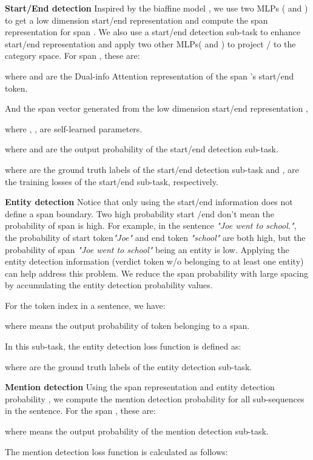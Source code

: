 \documentclass[11pt,a4paper]{article}
\begin{document}
\textbf{Start/End detection}
Inspired by the biaffine model \cite{dozat2016biaffine}, we use two MLPs ( and ) to get a low dimension start/end representation  and compute the span representation  for span .
We also use a start/end detection sub-task to enhance start/end representation  and apply two other MLPs( and ) to project / to the category space.
For span , these are:

where  and  are the Dual-info Attention representation of the span 's start/end token.

And the span vector  generated from the low dimension start/end representation ,

where ,
,
 are self-learned parameters.


where  and  are the output probability of the start/end detection sub-task.


where  are the ground truth labels of the start/end detection sub-task and ,  are the training losses of the start/end sub-task, respectively.



\textbf{Entity detection}
Notice that only using the start/end information does not define a span boundary. Two high probability start /end  don't mean the probability of span  is high.
For example, in the sentence \textit{"Joe went to school."}, the probability of start token\textit{"Joe"} and end token \textit{"school"} are both high, but the probability of span \textit{"Joe went to school"} being an entity is low.
Applying the entity detection information (verdict token w/o belonging to at least one entity) can help address this problem. We reduce the span probability with large spacing by accumulating the entity detection probability values.

For the token index  in a sentence, we have:

where  means the output probability of token  belonging to a span.

In this sub-task, the entity detection loss function  is defined as:

where  are the ground truth labels of the entity detection sub-task.

\textbf{Mention detection}
Using the span representation  and entity detection probability , we compute the mention detection probability for all sub-sequences in the sentence.
For the span , these are:

where  means the output probability of the mention detection sub-task.

The mention detection loss function  is calculated as follows:
\end{document}
